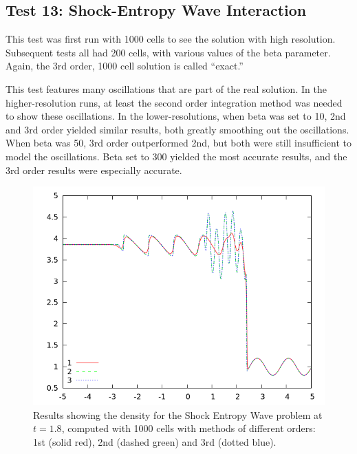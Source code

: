\documentclass[10pt]{article}
\begin{document}
\clearpage

\subsection{Test 13: Shock-Entropy Wave Interaction}

This test was first run with 1000 cells to see the solution with high resolution. Subsequent tests all had 200 cells, with various values of the beta parameter. Again, the 3rd order, 1000 cell solution is called ``exact.''

This test features many oscillations that are part of the real solution. In the higher-resolution runs, at least the second order integration method was needed to show these oscillations. In the lower-resolutions, when beta was set to 10, 2nd and 3rd order yielded similar results, both greatly smoothing out the oscillations. When beta was 50, 3rd order outperformed 2nd, but both were still insufficient to model the oscillations. Beta set to 300 yielded the most accurate results, and the 3rd order results were especially accurate. 

\begin{figure}[h]
  \begin{center}
     \includegraphics[width=.95\textwidth]{1000.png}	
  \end{center}
  \caption{Results showing the density for the Shock Entropy Wave problem at $t=1.8$, computed with 1000 cells with methods of different orders: 1st (solid red), 2nd (dashed green) and 3rd (dotted blue).}
  \label{fig:shock}
\end{figure}
\end{document}
